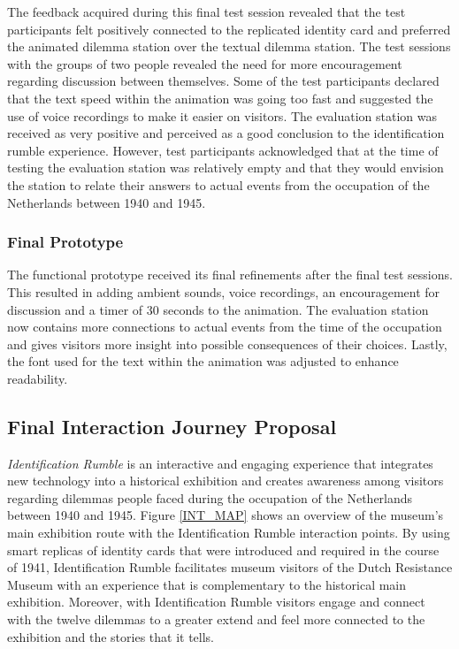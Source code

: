 The feedback acquired during this final test session revealed that the test participants felt positively connected to the replicated identity card and preferred the animated dilemma station over the textual dilemma station. The test sessions with the groups of two people revealed the need for more encouragement regarding discussion between themselves. Some of the test participants declared that the text speed within the animation was going too fast and suggested the use of voice recordings to make it easier on visitors. The evaluation station was received as very positive and perceived as a good conclusion to the identification rumble experience. However, test participants acknowledged that at the time of testing the evaluation station was relatively empty and that they would envision the station to relate their answers to actual events from the occupation of the Netherlands between 1940 and 1945.


\subsubsection{Final Prototype}
The functional prototype received its final refinements after the final test sessions. This resulted in adding ambient sounds, voice recordings, an encouragement for discussion and a timer of 30 seconds to the animation. The evaluation station now contains more connections to actual events from the time of the occupation and gives visitors more insight into possible consequences of their choices. Lastly, the font used for the text within the animation was adjusted to enhance readability.

\subsection{Final Interaction Journey Proposal} \label{final_int_jour}
\textit{Identification Rumble} is an interactive and engaging experience that integrates new technology into a historical exhibition and creates awareness among visitors regarding dilemmas people faced during the occupation of the Netherlands between 1940 and 1945. Figure \ref{INT_MAP} shows an overview of the museum's main exhibition route with the Identification Rumble interaction points. By using smart replicas of identity cards that were introduced and required in the course of 1941, Identification Rumble facilitates museum visitors of the Dutch Resistance Museum with an experience that is complementary to the historical main exhibition. Moreover, with Identification Rumble visitors engage and connect with the twelve dilemmas to a greater extend and feel more connected to the exhibition and the stories that it tells. 

